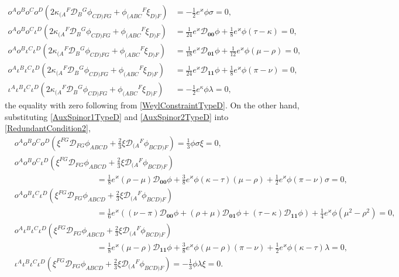 \documentclass[10pt,a4paper]{article}
\newcommand\omicron{o}
\theoremstyle{plain}
\begin{document}
\begin{align*}
\omicron^A \omicron^B \omicron^C \omicron^D \left(2\kappa_{(A}{}^{F}\mathcal{D}_{B}{}^{G}\phi_{CD)FG} + \phi_{(ABC}{}^{F}\xi_{D)F}\right) 
&=- \tfrac{1}{2} e^{\varkappa}\phi \sigma=0,\\
\omicron^A \omicron^B \omicron^C \iota^D \left(2\kappa_{(A}{}^{F}\mathcal{D}_{B}{}^{G}\phi_{CD)FG} + \phi_{(ABC}{}^{F}\xi_{D)F}\right) & =\tfrac{1}{24} e^{\varkappa} \mathcal{D}_{\bm0\bm0}\phi + \tfrac{1}{8} e^{\varkappa}\phi (\tau - \kappa)  =0,\\
 \omicron^A \omicron^B \iota^C \iota^D \left(2\kappa_{(A}{}^{F}\mathcal{D}_{B}{}^{G}\phi_{CD)FG} + \phi_{(ABC}{}^{F}\xi_{D)F}\right) 
& = \tfrac{1}{18} e^{\varkappa} \mathcal{D}_{\bm0\bm1}\phi + \tfrac{1}{12} e^{\varkappa}\phi (\mu - \rho)  = 0,\\
 \omicron^A \iota^B \iota^C \iota^D \left(2\kappa_{(A}{}^{F}\mathcal{D}_{B}{}^{G}\phi_{CD)FG} + \phi_{(ABC}{}^{F}\xi_{D)F}\right) & =\tfrac{1}{24} e^{\varkappa} \mathcal{D}_{\bm1\bm1}\phi + \tfrac{1}{8} e^{\varkappa} \phi(\pi-\nu)  = 0,\\
 \iota^A \iota^B \iota^C \iota^D \left(2\kappa_{(A}{}^{F}\mathcal{D}_{B}{}^{G}\phi_{CD)FG} + \phi_{(ABC}{}^{F}\xi_{D)F}\right) & = - \tfrac{1}{2} e^{\kappa} \phi \lambda = 0,
\end{align*}
the equality with zero following from \eqref{WeylConstraintTypeD}. 
On the other hand, substituting \eqref{AuxSpinor1TypeD} and \eqref{AuxSpinor2TypeD} into \eqref{RedundantCondition2}, 
\begin{align*}
& o^Ao^Bo^Co^D(\xi^{FG}\mathcal{D}_{FG}\phi_{ABCD} + \tfrac{2}{3} \xi \mathcal{D}_{(A}{}^{F}\phi_{BCD)F})  =\tfrac{1}{3} \phi \sigma  \xi =0,\\
& o^Ao^Bo^C\iota^D(\xi^{FG}\mathcal{D}_{FG}\phi_{ABCD} + \tfrac{2}{3} \xi \mathcal{D}_{(A}{}^{F}\phi_{BCD)F}) \\
&\qquad\qquad\qquad\qquad\qquad = \tfrac{1}{8} e^{\varkappa} (\rho-\mu) \mathcal{D}_{\bm0\bm0}\phi + \tfrac{3}{8}e^{\varkappa}\phi  (\kappa-\tau)(\mu - \rho)  +  \tfrac{1}{2} e^{\varkappa}\phi(\pi-\nu) \sigma   = 0	,\\
& o^Ao^B\iota^C\iota^D(\xi^{FG}\mathcal{D}_{FG}\phi_{ABCD} + \tfrac{2}{3} \xi \mathcal{D}_{(A}{}^{F}\phi_{BCD)F})  \\
&\qquad\qquad\qquad\qquad\qquad=	\tfrac{1}{6} e^{\varkappa}\left((\nu-\pi)\mathcal{D}_{\bm0\bm0}\phi + (\rho+\mu)\mathcal{D}_{\bm0\bm1}\phi + (\tau-\kappa)\mathcal{D}_{\bm1\bm1}\phi \right)  + \tfrac{1}{4} e^{\varkappa} \phi(\mu^2-\rho^2) = 0,\\
& o^A\iota^B\iota^C\iota^D(\xi^{FG}\mathcal{D}_{FG}\phi_{ABCD} + \tfrac{2}{3} \xi \mathcal{D}_{(A}{}^{F}\phi_{BCD)F})  \\
& \qquad\qquad\qquad\qquad\qquad =	\tfrac{1}{8} e^{\varkappa}  (\mu - \rho) \mathcal{D}_{\bm1\bm1}\phi  +  \tfrac{3}{8} e^{\varkappa} \phi(\mu-\rho) (\pi-\nu) + \tfrac{1}{2} e^{\varkappa}\phi (\kappa-\tau) \lambda    = 0,\\
& \iota^A\iota^B\iota^C\iota^D(\xi^{FG}\mathcal{D}_{FG}\phi_{ABCD} + \tfrac{2}{3} \xi \mathcal{D}_{(A}{}^{F}\phi_{BCD)F})  =	- \tfrac{1}{3}\phi \lambda \xi = 0.
\end{align*}
\end{document}
